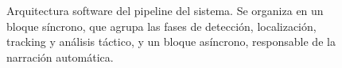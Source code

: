 \begin{figure}[H]
{
}
\caption[Arquitectura software del pipeline]{Arquitectura software del pipeline del sistema. Se organiza en un bloque síncrono, que agrupa las fases de detección, localización, tracking y análisis táctico, y un bloque asíncrono, responsable de la narración automática.}
\label{fig:arquitectura-software}
\end{figure}
